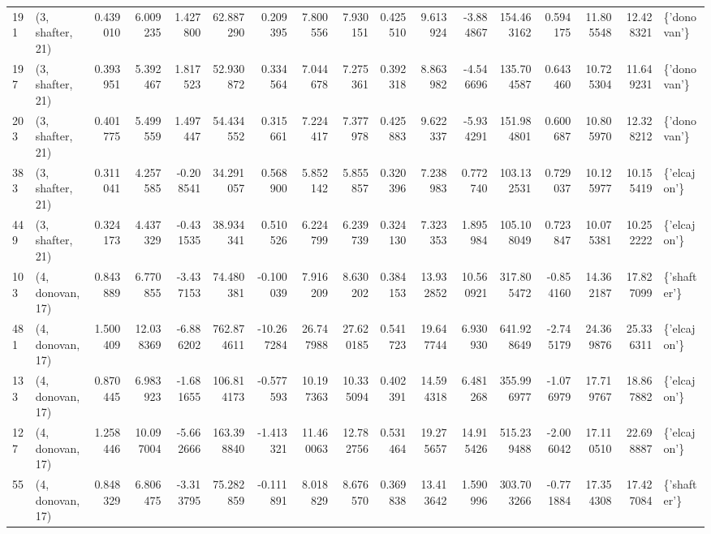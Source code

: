 \begin{tabular}{llrrrrrrrrrrrrrrl}
191 &  (3, shafter, 21) &   0.439010 &   6.009235 &   1.427800 &    62.887290 &   0.209395 &   7.800556 &   7.930151 &  0.425510 &   9.613924 &  -3.884867 &   154.463162 &   0.594175 &  11.805548 &  12.428321 &  \{'donovan'\} \\
197 &  (3, shafter, 21) &   0.393951 &   5.392467 &   1.817523 &    52.930872 &   0.334564 &   7.044678 &   7.275361 &  0.392318 &   8.863982 &  -4.546696 &   135.704587 &   0.643460 &  10.725304 &  11.649231 &  \{'donovan'\} \\
203 &  (3, shafter, 21) &   0.401775 &   5.499559 &   1.497447 &    54.434552 &   0.315661 &   7.224417 &   7.377978 &  0.425883 &   9.622337 &  -5.934291 &   151.984801 &   0.600687 &  10.805970 &  12.328212 &  \{'donovan'\} \\
383 &  (3, shafter, 21) &   0.311041 &   4.257585 &  -0.208541 &    34.291057 &   0.568900 &   5.852142 &   5.855857 &  0.320396 &   7.238983 &   0.772740 &   103.132531 &   0.729037 &  10.125977 &  10.155419 &  \{'elcajon'\} \\
449 &  (3, shafter, 21) &   0.324173 &   4.437329 &  -0.431535 &    38.934341 &   0.510526 &   6.224799 &   6.239739 &  0.324130 &   7.323353 &   1.895984 &   105.108049 &   0.723847 &  10.075381 &  10.252222 &  \{'elcajon'\} \\
103 &  (4, donovan, 17) &   0.843889 &   6.770855 &  -3.437153 &    74.480381 &  -0.100039 &   7.916209 &   8.630202 &  0.384153 &  13.932852 &  10.560921 &   317.805472 &  -0.854160 &  14.362187 &  17.827099 &  \{'shafter'\} \\
481 &  (4, donovan, 17) &   1.500409 &  12.038369 &  -6.886202 &   762.874611 & -10.267284 &  26.747988 &  27.620185 &  0.541723 &  19.647744 &   6.930930 &   641.928649 &  -2.745179 &  24.369876 &  25.336311 &  \{'elcajon'\} \\
133 &  (4, donovan, 17) &   0.870445 &   6.983923 &  -1.681655 &   106.814173 &  -0.577593 &  10.197363 &  10.335094 &  0.402391 &  14.594318 &   6.481268 &   355.996977 &  -1.076979 &  17.719767 &  18.867882 &  \{'elcajon'\} \\
127 &  (4, donovan, 17) &   1.258446 &  10.097004 &  -5.662666 &   163.398840 &  -1.413321 &  11.460063 &  12.782756 &  0.531464 &  19.275657 &  14.915426 &   515.239488 &  -2.006042 &  17.110510 &  22.698887 &  \{'elcajon'\} \\
55  &  (4, donovan, 17) &   0.848329 &   6.806475 &  -3.313795 &    75.282859 &  -0.111891 &   8.018829 &   8.676570 &  0.369838 &  13.413642 &   1.590996 &   303.703266 &  -0.771884 &  17.354308 &  17.427084 &  \{'shafter'\} \\

\end{tabular}
